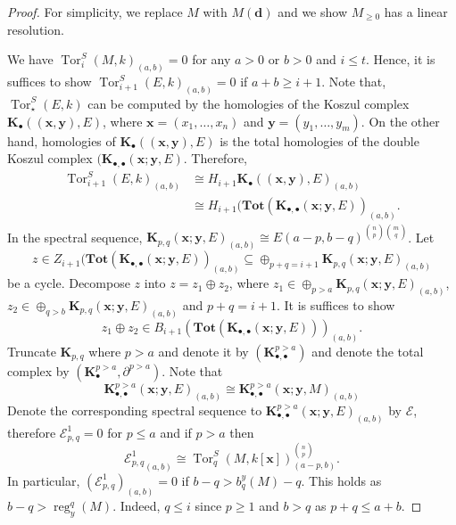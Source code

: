 \documentclass[11pt]{amsart}
\DeclareMathOperator{\reg}{reg}
\DeclareMathOperator{\tor}{Tor}
\DeclareMathOperator{\Tor}{Tor}
\theoremstyle{definition}
\begin{document}
\begin{proof}
For simplicity, we replace $M$ with $M(\textbf{d})$ and we show $M_{\geq 0}$ has a linear resolution.

We have $\tor_i^S(M,k)_{(a,b)}=0$ for any $a>0$ or $b> 0$ and $i\leq t$. Hence, it is suffices to show $\tor_{i+1}^S(E,k)_{(a,b)} =0 $ if $a+b\geq i+1$. Note that, $\Tor^S_{\star}(E,k)$ can be computed by the homologies of the Koszul complex $\textbf{K}_{\bullet}((\textbf{x},\textbf{y}),E )$, where $\textbf{x}= (x_1,\dots,x_n)$ and $\textbf{y}= (y_1,\dots, y_m)$. On the other hand, homologies of $\textbf{K}_{\bullet}((\textbf{x},\textbf{y}),E )$ is the total homologies of the double Koszul complex $(\textbf{K}_{\bullet,\bullet}(\textbf{x};\textbf{y},E )$. Therefore,
\begin{align*}
\tor_{i+1}^S(E,k)_{(a,b)}&\cong H_{i+1}\textbf{K}_{\bullet}((\textbf{x},\textbf{y}),E )_{(a,b)}\\
&\cong H_{i+1}(\textbf{Tot}(\textbf{K}_{\bullet,\bullet}(\textbf{x};\textbf{y},E))_{(a,b)}.
\end{align*}
 In the spectral sequence, $\textbf{K}_{p,q}(\textbf{x};\textbf{y},E)_{(a,b)}\cong E(a-p,b-q)^{\binom{n}{p}\binom{m}{q}}$. Let 
 $$
 z\in Z_{i+1}(\textbf{Tot}(\textbf{K}_{\bullet,\bullet}(\textbf{x};\textbf{y},E))_{(a,b)}\subseteq  \oplus_{p+q=i+1}\textbf{K}_{p,q}(\textbf{x};\textbf{y},E)_{(a,b)}
 $$
  be a cycle. Decompose $z$ into  $z=z_1\oplus z_2$, where $ z_1\in \oplus_{
 p>a} \textbf{K}_{p,q}(\textbf{x};\textbf{y},E)_{(a,b)}$,$ z_2\in \oplus_{
 q>b} \textbf{K}_{p,q}(\textbf{x};\textbf{y},E)_{(a,b)}$ and $p+q=i+1$.
It is suffices to show  
$$
 z_1\oplus z_2 \in B_{i+1}(\textbf{Tot}(\textbf{K}_{\bullet,\bullet}(\textbf{x};\textbf{y},E)))_{(a,b)}.
 $$
Truncate $\textbf{K}_{p,q}$ where $p>a$ and denote it by $(\textbf{K}_{\bullet,\bullet}^{p>a})$ and denote the total complex by $(\textbf{K}^{p>a}_{\bullet}, \partial^{p>a})$. Note that
$$
\textbf{K}_{\bullet,\bullet}^{p>a}(\textbf{x};\textbf{y},E)_{(a,b)}\cong \textbf{K}_{\bullet,\bullet}^{p>a}(\textbf{x};\textbf{y},M)_{(a,b)}
$$
Denote  the corresponding spectral sequence to $\textbf{K}_{\bullet,\bullet}^{p>a}(\textbf{x};\textbf{y},E)_{(a,b)}$ by $\mathcal{E}$, therefore
$ \mathcal{E}^1_{p,q}= 0$ for $p\leq a$ and if $p>a$ then 
$$
{\mathcal{E}^1_{p,q}}_{(a,b)}\cong \tor_q^S(M, k[\textbf{x}])_{(a-p,b)}^{\binom{n}{p}}.
$$
In particular, $(\mathcal{E}^1_{p,q})_{(a,b)}=0$ if  $b-q> b^y_q(M)-q$. This holds as $b-q>\reg^q_y(M)$. Indeed, $q\leq i$ since $p\geq 1$ and $b>q$ as $p+q\leq a+b$.


\end{proof}
\end{document}
